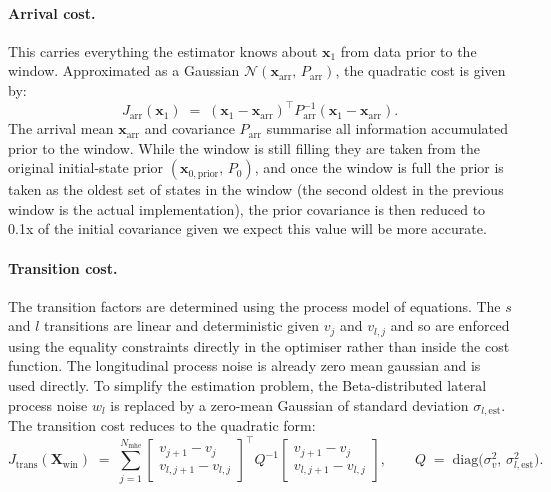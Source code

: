 \documentclass{article}
\begin{document}
\paragraph{Arrival cost.}
This carries everything the estimator knows about $\mathbf{x}_{1}$ from data prior to the window. Approximated as a Gaussian $\mathcal{N}(\mathbf{x}_{\text{arr}},\,P_{\text{arr}})$, the quadratic cost is given by:
\begin{equation}
    J_{\text{arr}}(\mathbf{x}_{1}) \;=\; (\mathbf{x}_{1} - \mathbf{x}_{\text{arr}})^{\top} P_{\text{arr}}^{-1} (\mathbf{x}_{1} - \mathbf{x}_{\text{arr}}).
    \label{eq:cost_arr}
\end{equation}
The arrival mean $\mathbf{x}_{\text{arr}}$ and covariance $P_{\text{arr}}$ summarise all information accumulated prior to the window. While the window is still filling they are taken from the original initial-state prior $(\mathbf{x}_{0,\text{prior}},\,P_{0})$, and once the window is full the prior is taken as the oldest set of states in the window (the second oldest in the previous window is the actual implementation), the prior covariance is then reduced to 0.1x of the initial covariance given we expect this value will be more accurate. 

\paragraph{Transition cost.}
The transition factors are determined using the process model of equations. The $s$ and $l$ transitions are linear and deterministic given $v_{j}$ and $v_{l,j}$ and so are enforced using the equality constraints directly in the optimiser rather than inside the cost function. The longitudinal process noise is already zero mean gaussian and is used directly. To simplify the estimation problem, the Beta-distributed lateral process noise $w_{l}$ is replaced by a zero-mean Gaussian of standard deviation $\sigma_{l,\text{est}}$. The transition cost reduces to the quadratic form:
\begin{equation}
    J_{\text{trans}}(\mathbf{X}_{\text{win}}) \;=\; \sum_{j=1}^{N_{\text{mhe}}}
        \begin{bmatrix} v_{j+1}-v_{j} \\ v_{l,j+1}-v_{l,j} \end{bmatrix}^{\top}
        Q^{-1}
        \begin{bmatrix} v_{j+1}-v_{j} \\ v_{l,j+1}-v_{l,j} \end{bmatrix},
    \qquad
    Q \;=\; \mathrm{diag}\!\bigl(\sigma_{v}^{2},\,\sigma_{l,\text{est}}^{2}\bigr).
    \label{eq:cost_trans}
\end{equation}
\end{document}
